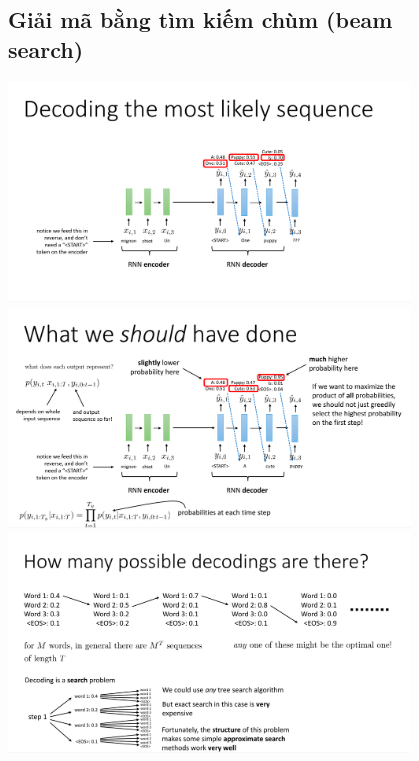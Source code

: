 \documentclass{book}
\begin{document}
\begin{figure}[H]
    \subsection{Giải mã bằng tìm kiếm chùm (beam search)}
    \includegraphics[width=0.95\textwidth]{images/lec11_6.png}
    \includegraphics[width=0.95\textwidth]{images/lec11_7.png}
    \includegraphics[width=0.95\textwidth]{images/lec11_8.png}
\end{figure}
\end{document}
